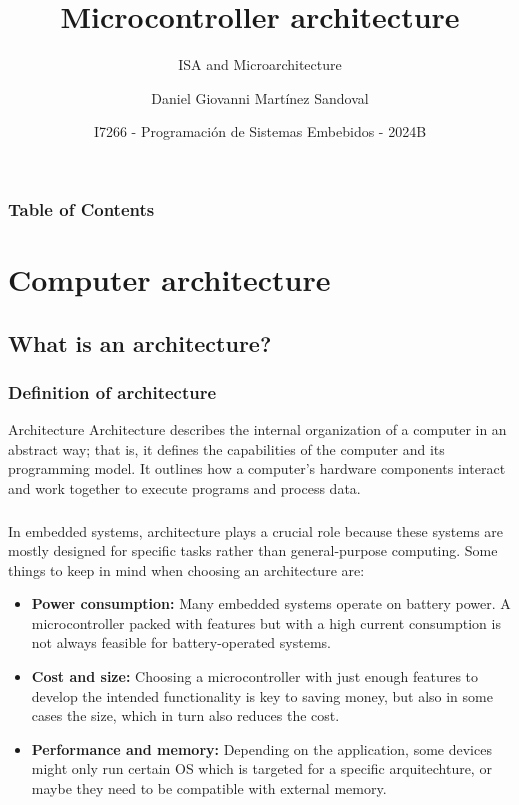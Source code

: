 \documentclass[aspectratio=169]{beamer}
\title[Microcontroller architecture] %
{Microcontroller architecture}
\subtitle{ISA and Microarchitecture}
\author{Daniel Giovanni Martínez Sandoval}
\institute[CUCEI - UDG]
{
  \textsc{
    \textbf{Universidad de Guadalajara}\\
    {\tiny Centro Universitario de Ciencias Exactas e Ingenierías}
  }
}
\date[September 2024] %
{\footnotesize I7266 - Programación de Sistemas Embebidos - 2024B }
\begin{document}
\frame{\titlepage}


\begin{frame}
\frametitle{Table of Contents}
\tableofcontents
\end{frame}


\section{Computer architecture}
\subsection{What is an architecture?}

\begin{frame}
\frametitle{Definition of architecture}
  \begin{block}{Architecture}
    Architecture describes the internal organization of a computer in an abstract way; that is, it deﬁnes the capabilities of the computer and its programming model.\cite{clements} It outlines how a computer's hardware components interact and work together to execute programs and process data.   
  \end{block}
\end{frame}

\begin{frame}
  \frametitle{}
  In embedded systems, architecture plays a crucial role because these systems are mostly designed for specific tasks rather than general-purpose computing. Some things to keep in mind when choosing an architecture are:
  \begin{itemize}
    \item <1-> \textbf{Power consumption:} Many embedded systems operate on battery power. A microcontroller packed with features but with a high current consumption is not always feasible for battery-operated systems. 
    \item <2-> \textbf{Cost and size:} Choosing a microcontroller with just enough features to develop the intended functionality is key to saving money, but also in some cases the size, which in turn also reduces the cost.
    \item <3-> \textbf{Performance and memory:} Depending on the application, some devices might only run certain OS which is targeted for a specific arquitechture, or maybe they need to be compatible with external memory. 
  \end{itemize}
\end{frame}
\end{document}

